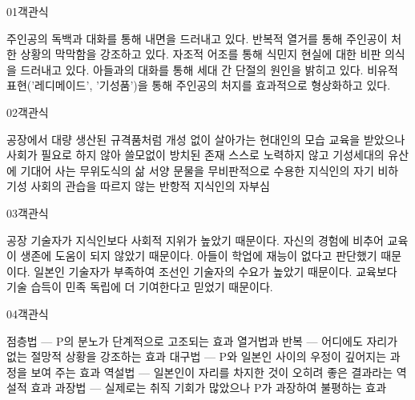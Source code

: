 \documentclass[fs85,seriesWit]{korfarm-base}
\begin{document}
\kfBeginMC
\begin{kfQBlock}{01}{객관식}
\begin{kfChoices}
\kfChoice 주인공의 독백과 대화를 통해 내면을 드러내고 있다.
\kfChoice 반복적 열거를 통해 주인공이 처한 상황의 막막함을 강조하고 있다.
\kfChoice 자조적 어조를 통해 식민지 현실에 대한 비판 의식을 드러내고 있다.
\kfChoice 아들과의 대화를 통해 세대 간 단절의 원인을 밝히고 있다.
\kfChoice 비유적 표현('레디메이드', '기성품')을 통해 주인공의 처지를 효과적으로 형상화하고 있다.
\end{kfChoices}
\end{kfQBlock}

\begin{kfQBlock}{02}{객관식}
\begin{kfChoices}
\kfChoice 공장에서 대량 생산된 규격품처럼 개성 없이 살아가는 현대인의 모습
\kfChoice 교육을 받았으나 사회가 필요로 하지 않아 쓸모없이 방치된 존재
\kfChoice 스스로 노력하지 않고 기성세대의 유산에 기대어 사는 무위도식의 삶
\kfChoice 서양 문물을 무비판적으로 수용한 지식인의 자기 비하
\kfChoice 기성 사회의 관습을 따르지 않는 반항적 지식인의 자부심
\end{kfChoices}
\end{kfQBlock}

\begin{kfQBlock}{03}{객관식}
\begin{kfChoices}
\kfChoice 공장 기술자가 지식인보다 사회적 지위가 높았기 때문이다.
\kfChoice 자신의 경험에 비추어 교육이 생존에 도움이 되지 않았기 때문이다.
\kfChoice 아들이 학업에 재능이 없다고 판단했기 때문이다.
\kfChoice 일본인 기술자가 부족하여 조선인 기술자의 수요가 높았기 때문이다.
\kfChoice 교육보다 기술 습득이 민족 독립에 더 기여한다고 믿었기 때문이다.
\end{kfChoices}
\end{kfQBlock}

\begin{kfQBlock}{04}{객관식}
\begin{kfChoices}
\kfChoice 점층법 — P의 분노가 단계적으로 고조되는 효과
\kfChoice 열거법과 반복 — 어디에도 자리가 없는 절망적 상황을 강조하는 효과
\kfChoice 대구법 — P와 일본인 사이의 우정이 깊어지는 과정을 보여 주는 효과
\kfChoice 역설법 — 일본인이 자리를 차지한 것이 오히려 좋은 결과라는 역설적 효과
\kfChoice 과장법 — 실제로는 취직 기회가 많았으나 P가 과장하여 불평하는 효과
\end{kfChoices}
\end{kfQBlock}
\end{document}
